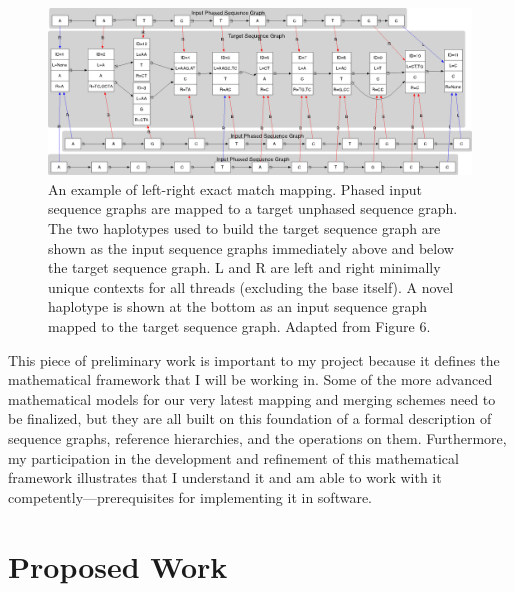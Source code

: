 \documentclass[11pt,proposal]{ucthesis}
\begin{document}
\begin{figure}[ht]
    \centering
    \includegraphics[width=1.0\textwidth]{figures/lrexactmatchgraph.png}
    \caption[An example of left-right exact match mapping]{An example of left-right exact match mapping. Phased input sequence graphs are mapped to a target unphased sequence graph. The two haplotypes used to build the target sequence graph are shown as the input sequence graphs immediately above and below the target sequence graph. L and R are left and right minimally unique contexts for all threads (excluding the base itself). A novel haplotype is shown at the bottom as an input sequence graph mapped to the target sequence graph. Adapted from \cite{paten2014mapping} Figure 6.} 
    \label{fig:lrexactmatchgraph}
\end{figure}

This piece of preliminary work is important to my project because it defines the mathematical framework that I will be working in. Some of the more advanced mathematical models for our very latest mapping and merging schemes need to be finalized, but they are all built on this foundation of a formal description of sequence graphs, reference hierarchies, and the operations on them. Furthermore, my participation in the development and refinement of this mathematical framework illustrates that I understand it and am able to work with it competently---prerequisites for implementing it in software.





\chapter{Proposed Work}
\end{document}
